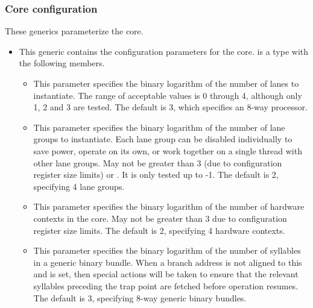 
\subsubsection{Core configuration}
\label{sec:core-ug-cfg-inst-iface-generics}

These generics parameterize the core.

\begin{itemize}

\item {}

This generic contains the configuration parameters for the core.
 is a  type with the following
members.

\begin{itemize}

\item {}

This parameter specifies the binary logarithm of the number of lanes to
instantiate. The range of acceptable values is 0 through 4, although only 1, 2
and 3 are tested. The default is 3, which specifies an 8-way \rvex{} processor.

\item {}

This parameter specifies the binary logarithm of the number of lane groups to
instantiate. Each lane group can be disabled individually to save power, operate
on its own, or work together on a single thread with other lane groups. May not
be greater than 3 (due to configuration register size limits) or
. It is only tested up to -1. The default
is 2, specifying 4 lane groups.

\item {}

This parameter specifies the binary logarithm of the number of hardware contexts
in the core. May not be greater than 3 due to configuration register size limits.
The default is 2, specifying 4 hardware contexts.

\item {}

This parameter specifies the binary logarithm of the number of syllables in a
generic binary bundle. When a branch address is not aligned to this and
 is set, then special actions will be taken to
ensure that the relevant syllables preceding the trap point are fetched before
operation resumes. The default is 3, specifying 8-way generic binary bundles.


\end{itemize}
\end{itemize}
